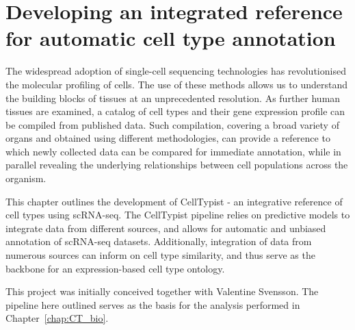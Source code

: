 \chapter{Developing an integrated reference for automatic cell type annotation} \label{chap:CT_method}

\ifpdf
    \graphicspath{{Chapter3/Figs/Raster/}{Chapter3/Figs/PDF/}{Chapter3/Figs/}}
\else
    \graphicspath{{Chapter3/Figs/Vector/}{Chapter3/Figs/}}
\fi
The widespread adoption of single-cell sequencing technologies has revolutionised the molecular profiling of cells. The use of these methods allows us to understand the building blocks of tissues at an unprecedented resolution. As further human tissues are examined, a catalog of cell types and their gene expression profile can be compiled from published data. Such compilation, covering a broad variety of organs and obtained using different methodologies, can provide a reference to which newly collected data can be compared for immediate annotation, while in parallel revealing the underlying relationships between cell populations across the organism.

This chapter outlines the development of CellTypist - an integrative reference of cell types using scRNA-seq. The CellTypist pipeline relies on predictive models to integrate data from different sources, and allows for automatic and unbiased annotation of scRNA-seq datasets. Additionally, integration of data from numerous sources can inform on cell type similarity, and thus serve as the backbone for an expression-based cell type ontology.

This project was initially conceived together with Valentine Svensson. The pipeline here outlined serves as the basis for the analysis performed in Chapter~\ref{chap:CT_bio}.


